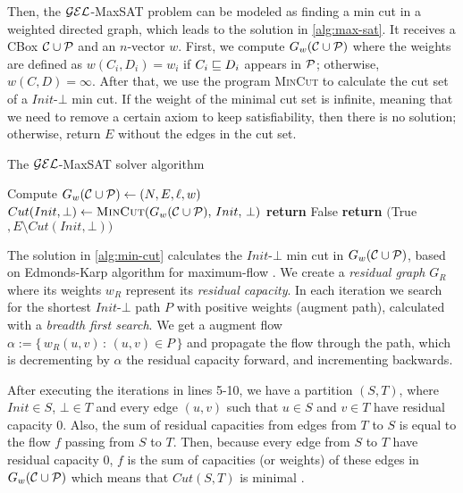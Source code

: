 Then, the $\mathcal{GEL}$-MaxSAT problem can be modeled as finding a min cut in a weighted directed graph, which leads to the solution in \autoref{alg:max-sat}. It receives a CBox $\mathcal{C} \cup \mathcal{P}$ and an $n$-vector $w$. First, we compute $G_w(\mathcal{C} \cup \mathcal{P})$ where the weights are defined as $w(C_i, D_i) = w_i$ if $C_i \sqsubseteq D_i$ appears in $\mathcal{P}$; otherwise, $w(C, D) = \infty$. After that, we use the program \textsc{MinCut} to calculate the cut set of a $Init$-$\bot$ min cut. If the weight of the minimal cut set is infinite, meaning that we need to remove a certain axiom to keep satisfiability, then there is no solution; otherwise, return $E$ without the edges in the cut set.

\begin{algorithm}
	\caption{The $\mathcal{GEL}$-MaxSAT solver algorithm}
	\label{alg:max-sat}
	\begin{algorithmic}[1]
		\State Compute $G_w(\mathcal{C} \cup \mathcal{P}) \gets (N, E, \ell, w)$
		\State $Cut(Init, \bot) \gets \Call{MinCut}{G_w(\CC \cup \PP),\, Init,\, \bot}$
		\State \textbf{return} False
		\EndIf
		\Statex
		\State \textbf{return} $($True$, E \setminus Cut(Init, \bot))$
		\EndFunction
	\end{algorithmic}
\end{algorithm}

The solution in \autoref{alg:min-cut} calculates the $Init$-$\bot$ min cut in $G_w(\mathcal{C} \cup \mathcal{P})$, based on Edmonds-Karp algorithm for maximum-flow \citep{cormen2009introduction}. We create a \emph{residual graph} $G_R$ where its weights $w_R$ represent its \emph{residual capacity}. In each iteration we search for the shortest $Init$-$\bot$ path $P$ with positive weights (augment path), calculated with a \emph{breadth first search}. We get a augment flow $\alpha := \{ \, w_R(u,v) \, : \, (u,v) \in P \, \}$ and propagate the flow through the path, which is decrementing by $\alpha$ the residual capacity forward, and incrementing backwards. 

After executing the iterations in lines 5-10, we have a partition $(S, T)$, where $Init \in S$, $\bot \in T$ and every edge $(u, v)$ such that $u \in S$ and $v \in T$ have residual capacity 0. Also, the sum of residual capacities from edges from $T$ to $S$ is equal to the flow $f$ passing from $S$ to $T$. Then, because every edge from $S$ to $T$ have residual capacity 0, $f$ is the sum of capacities (or weights) of these edges in $G_w(\mathcal{C} \cup \mathcal{P})$ which means that $Cut(S, T)$ is minimal \citep{ford1962flows}.


